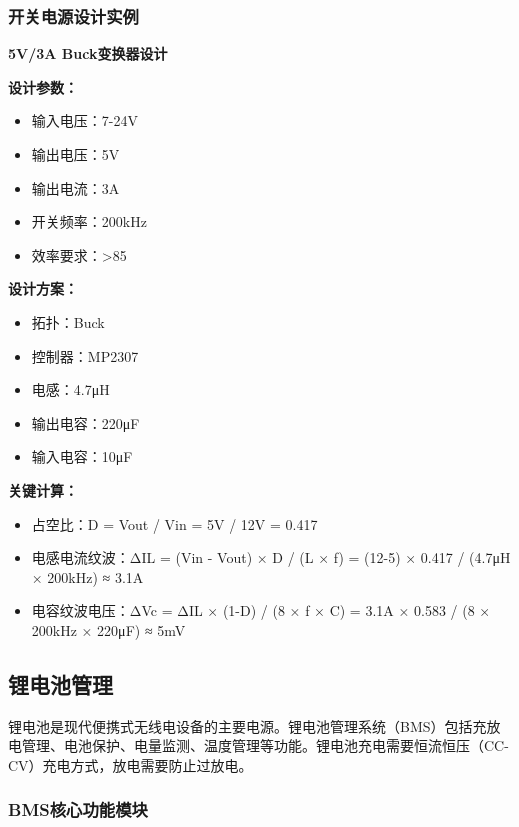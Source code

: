 \documentclass[12pt,UTF8]{ctexbook}
\begin{document}
\subsubsection{开关电源设计实例}

\textbf{5V/3A Buck变换器设计}

\textbf{设计参数：}
\begin{itemize}
    \item 输入电压：7-24V
    \item 输出电压：5V
    \item 输出电流：3A
    \item 开关频率：200kHz
    \item 效率要求：>85%
\end{itemize}

\textbf{设计方案：}
\begin{itemize}
    \item 拓扑：Buck
    \item 控制器：MP2307
    \item 电感：4.7μH
    \item 输出电容：220μF
    \item 输入电容：10μF
\end{itemize}

\textbf{关键计算：}
\begin{itemize}
    \item 占空比：D = Vout / Vin = 5V / 12V = 0.417
    \item 电感电流纹波：ΔIL = (Vin - Vout) × D / (L × f) = (12-5) × 0.417 / (4.7μH × 200kHz) ≈ 3.1A
    \item 电容纹波电压：ΔVc = ΔIL × (1-D) / (8 × f × C) = 3.1A × 0.583 / (8 × 200kHz × 220μF) ≈ 5mV
\end{itemize}

\subsection{锂电池管理}

锂电池是现代便携式无线电设备的主要电源。锂电池管理系统（BMS）包括充放电管理、电池保护、电量监测、温度管理等功能。锂电池充电需要恒流恒压（CC-CV）充电方式，放电需要防止过放电。

\subsubsection{BMS核心功能模块}
\end{document}
